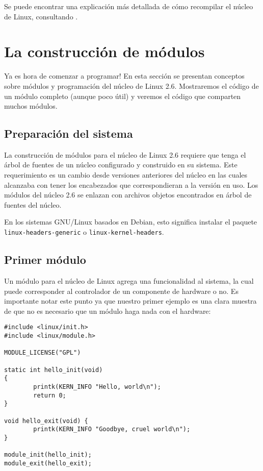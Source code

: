 \documentclass[12pt,a4paper,spanish]{article}
\begin{document}
Se puede encontrar una explicación más detallada de cómo recompilar el núcleo de Linux, consultando \cite{KerHT}.

\section{La construcción de módulos}

Ya es hora de comenzar a programar! En esta sección se presentan conceptos sobre módulos y programación del núcleo de Linux 2.6. Mostraremos el código de un módulo completo (aunque poco útil) y veremos el código que comparten muchos módulos.

\subsection{Preparación del sistema}

La construcción de módulos para el núcleo de Linux 2.6 requiere que tenga el árbol de fuentes de un núcleo configurado y construido en su sistema. Este requerimiento es un cambio desde versiones anteriores del núcleo en las cuales alcanzaba con tener los encabezados que correspondieran a la versión en uso. Los módulos del núcleo 2.6 se enlazan con archivos objetos encontrados en árbol de fuentes del núcleo.

En los sistemas GNU/Linux basados en Debian, esto significa instalar el paquete \verb+linux-headers-generic+ o \verb+linux-kernel-headers+.

\subsection{Primer módulo}

Un módulo para el núcleo de Linux agrega una funcionalidad al sistema, la cual puede corresponder al controlador de un componente de hardware o no. Es importante notar este punto ya que nuestro primer ejemplo es una clara muestra de que no es necesario que un módulo haga nada con el hardware:

\begin{small}
\begin{verbatim}
#include <linux/init.h>
#include <linux/module.h>

MODULE_LICENSE("GPL")

static int hello_init(void)
{
        printk(KERN_INFO "Hello, world\n");
        return 0;
}

void hello_exit(void) {
        printk(KERN_INFO "Goodbye, cruel world\n");
}

module_init(hello_init);
module_exit(hello_exit);
\end{verbatim}
\end{small} 
\end{document}
